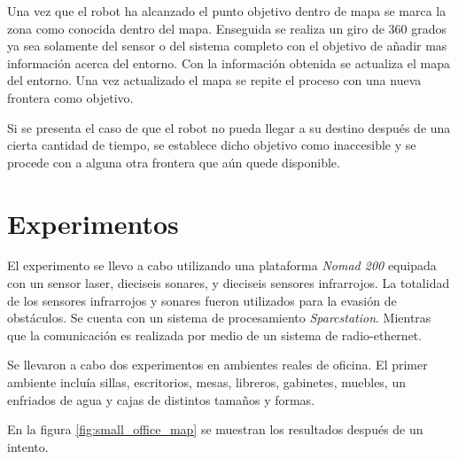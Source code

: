 \documentclass[12pt]{article}
\begin{document}
Una vez que el robot ha alcanzado el punto objetivo dentro de mapa se marca la zona como conocida dentro del mapa. Enseguida se realiza un giro de 360 grados ya sea solamente del sensor o del sistema completo con el objetivo de añadir mas información acerca del entorno. Con la información obtenida se actualiza el mapa del entorno. Una vez actualizado el mapa se repite el proceso con una nueva frontera como objetivo.

Si se presenta el caso de que el robot no pueda llegar a su destino después de una cierta cantidad de tiempo, se establece dicho objetivo como inaccesible y se procede con a alguna otra frontera que aún quede disponible.

\section{Experimentos}

El experimento se llevo a cabo utilizando una plataforma \emph{Nomad 200} equipada con un sensor laser, dieciseis sonares, y dieciseis sensores infrarrojos. La totalidad de los sensores infrarrojos y sonares fueron utilizados para la evasión de obstáculos. Se cuenta con un sistema de procesamiento \emph{Sparcstation}. Mientras que la comunicación es realizada por medio de un sistema de radio-ethernet.

Se llevaron a cabo dos experimentos en ambientes reales de oficina. El primer ambiente incluía sillas, escritorios, mesas, libreros, gabinetes, muebles, un enfriados de agua y cajas de distintos tamaños y formas.

En la figura \ref{fig:small_office_map} se muestran los resultados después de un intento.
\end{document}
